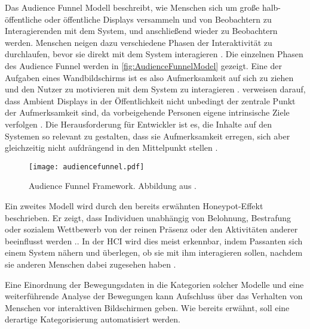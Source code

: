 Das Audience Funnel Modell \citep{wouters_uncovering_2016, mai_audience_2018} beschreibt,
wie Menschen sich um große halb-öffentliche oder öffentliche Displays versammeln
und von Beobachtern zu Interagierenden mit dem System, und anschließend wieder zu Beobachtern werden.
Menschen neigen dazu verschiedene Phasen der Interaktivität zu durchlaufen,
bevor sie direkt mit dem System interagieren \citep{wouters_uncovering_2016, mai_audience_2018}.
Die einzelnen Phasen des Audience Funnel werden in \autoref{fig:AudienceFunnelModel} gezeigt.
Eine der Aufgaben eines Wandbildschirms ist es also Aufmerksamkeit auf sich zu ziehen
und den Nutzer zu motivieren mit dem System zu interagieren \citep{mai_audience_2018}.
\citet{mai_audience_2018} verweisen darauf, dass Ambient Displays in der Öffentlichkeit
nicht unbedingt der zentrale Punkt der Aufmerksamkeit sind, da vorbeigehende Personen eigene intrinsische Ziele verfolgen \citep{mai_audience_2018}.
Die Herausforderung für Entwickler ist es, die Inhalte auf den Systemen so relevant zu gestalten,
dass sie Aufmerksamkeit erregen, sich aber gleichzeitig nicht aufdrängend in den Mittelpunkt stellen \citep{mai_audience_2018}.
\begin{figure}[ht]
    \begin{center}
    \texttt{[image: audiencefunnel.pdf]}
    \end{center}
    \caption{Audience Funnel Framework. Abbildung aus \citet{mai_audience_2018}.}
    \label{fig:AudienceFunnelModel}
  \end{figure}

Ein zweites Modell wird durch den bereits erwähnten Honeypot-Effekt beschrieben.
Er zeigt, dass Individuen unabhängig von Belohnung, Bestrafung oder sozialem Wettbewerb
von der reinen Präsenz oder den Aktivitäten anderer beeinflusst werden \citep{wouters_uncovering_2016}..
In der \ac{HCI} wird dies meist erkennbar, indem Passanten sich einem System nähern
und überlegen, ob sie mit ihm interagieren sollen,
nachdem sie anderen Menschen dabei zugesehen haben \citep{wouters_uncovering_2016}.

Eine Einordnung der Bewegungsdaten in die Kategorien solcher Modelle
und eine weiterführende Analyse der Bewegungen kann Aufschluss über das Verhalten von Menschen
vor interaktiven Bildschirmen geben.
Wie bereits erwähnt, soll eine derartige Kategorisierung automatisiert werden.

